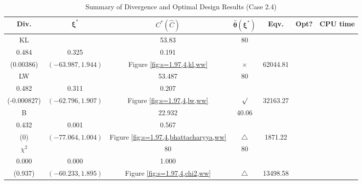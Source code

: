 \documentclass[12pt, a4paper]{article}
\begin{document}
\begin{table}[H]
\centering
\renewcommand{\arraystretch}{1.5} %
\setlength{\tabcolsep}{8pt} %
\begin{tabular}{|c|c|c|c|c|c|c|}
\hline
\textbf{Div.} & \(\boldsymbol{\xi^*}\) & \(C^* (\hat{C})\) & \(\boldsymbol{\hat{\theta}(\xi^*)}\) & \textbf{Eqv.} & \textbf{Opt?} & \textbf{CPU time} \\
\hline
KL & \(\left\{\begin{array}{ccc}
18.386 & 53.83 & 80 \\
0.484 & 0.325 & 0.191
\end{array}\right\}\) &
\(\begin{array}{c}
0.00386 \\
(0.00386)
\end{array}\) & 
\((-63.987, 1.944)\) & 
Figure \ref{fig:s=1.97,4,kl,ww} & $\times$ & 62044.81 \\
\hline
LW & \(\left\{\begin{array}{ccc}
16.897 & 53.487 & 80 \\
0.482 & 0.311 & 0.207
\end{array}\right\}\) &
\(\begin{array}{c}
0.00107 \\
(-0.000827)
\end{array}\) & 
\((-62.796, 1.907)\) & 
Figure \ref{fig:s=1.97,4,lw,ww} & $\surd$ & 32163.27 \\
\hline
B & \(\left\{\begin{array}{ccc}
11.969 & 22.932 & 40.06 \\
0.432 & 0.001 & 0.567
\end{array}\right\}\) &
\(\begin{array}{c}
0 \\
(0)
\end{array}\) & 
\((-77.064, 1.004)\) & 
Figure \ref{fig:s=1.97,4,bhattacharyya,ww} & $\triangle$ & 1871.22 \\
\hline
\(\chi^2\) & \(\left\{\begin{array}{ccc}
23.72 & 80 & 80 \\
0.000 & 0.000 & 1.000
\end{array}\right\}\) &
\(\begin{array}{c}
0.622 \\
(0.937)
\end{array}\) & 
\((-60.233, 1.895)\) & 
Figure \ref{fig:s=1.97,4,chi2,ww} & $\triangle$ & 13498.58 \\
\hline
\end{tabular}
\caption{Summary of Divergence and Optimal Design Results (Case 2.4)}
\label{tab:results2.4}
\end{table}
\end{document}
